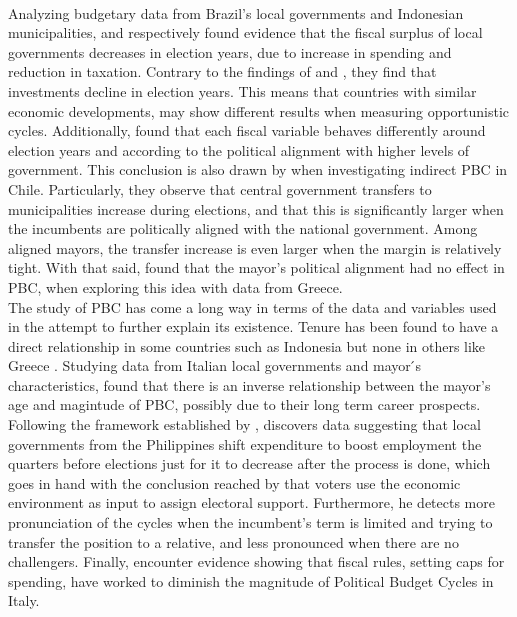 \\
Analyzing budgetary data from Brazil's local governments and Indonesian municipalities, \textcite{sarukai2010} and \textcite{setiawan2017} respectively found evidence that the fiscal surplus of local governments decreases in election years, due to increase in spending and reduction in taxation. Contrary to the findings of \textcite{veiga2007} and \textcite{drazen2010}, they find that investments decline in election years. This means that countries with similar economic developments, may show different results when measuring opportunistic cycles. Additionally, \textcite{sarukai2010} found that each fiscal variable behaves differently around election years and according to the political alignment with higher levels of government. This conclusion is also drawn by \textcite{corvalan2018} when investigating indirect PBC in Chile. Particularly, they observe that central government transfers to municipalities increase during elections, and that this is significantly larger when the incumbents are politically aligned with the national government. Among aligned mayors, the transfer increase is even larger when the margin is relatively tight. With that said, \textcite{chortareas2016} found that the mayor's political alignment had no effect in PBC, when exploring this idea with data from Greece.
\\
The study of PBC has come a long way in terms of the data and variables used in the attempt to further explain its existence. Tenure has been found to have a direct relationship in some countries such as Indonesia \parencite{sarukai2010} but none in others like Greece \parencite{chortareas2016}. Studying data from Italian local governments and mayor ́s characteristics, \textcite{alesina2018} found that there is an inverse relationship between the mayor's age and magintude of PBC, possibly due to their long term career prospects. Following the framework established by \textcite{nordhaus1975}, \textcite{labonne2016} discovers data suggesting that local governments from the Philippines shift expenditure to boost employment the quarters before elections just for it to decrease after the process is done, which goes in hand with the conclusion reached by \textcite{alfaro2019} that voters use the economic environment as input to assign electoral support. Furthermore, he detects more pronunciation of the cycles when the incumbent’s term is limited and trying to transfer the position to a relative, and less pronounced when there are no challengers. Finally, \textcite{bonfatti2019} encounter evidence showing that fiscal rules, setting caps for spending, have worked to diminish the magnitude of Political Budget Cycles in Italy.
